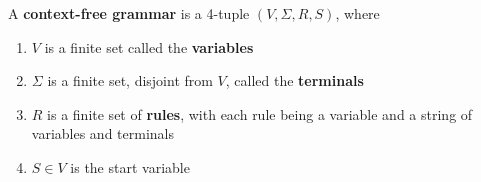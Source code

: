 \begin{definition}[CFG]
    A \textbf{context-free grammar} is a 4-tuple \((V, \Sigma, R, S)\), where
    \begin{enumerate}
        \item \(V\) is a finite set called the \textbf{variables}
        \item \(\Sigma\) is a finite set, disjoint from \(V\), called the \textbf{terminals}
        \item \(R\) is a finite set of \textbf{rules}, with each rule being a variable and a string of variables and terminals
        \item \(S \in V\) is the start variable       
    \end{enumerate}  
\end{definition}


